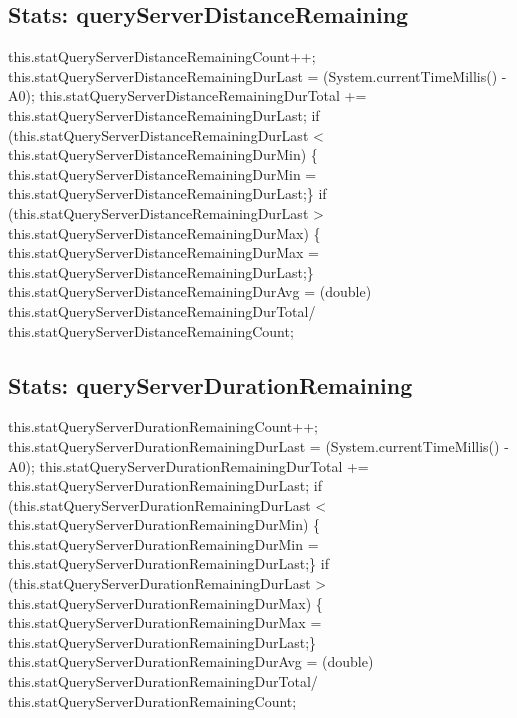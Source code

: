 \subsection{Stats: queryServerDistanceRemaining}
\nwenddocs{}\endmoddef{}
    this.statQueryServerDistanceRemainingCount++;
    this.statQueryServerDistanceRemainingDurLast = (System.currentTimeMillis() - A0);
    this.statQueryServerDistanceRemainingDurTotal +=
    this.statQueryServerDistanceRemainingDurLast;
if (this.statQueryServerDistanceRemainingDurLast <
    this.statQueryServerDistanceRemainingDurMin) \{
    this.statQueryServerDistanceRemainingDurMin =
    this.statQueryServerDistanceRemainingDurLast;\}
if (this.statQueryServerDistanceRemainingDurLast >
    this.statQueryServerDistanceRemainingDurMax) \{
    this.statQueryServerDistanceRemainingDurMax =
    this.statQueryServerDistanceRemainingDurLast;\}
    this.statQueryServerDistanceRemainingDurAvg = (double)
    this.statQueryServerDistanceRemainingDurTotal/
    this.statQueryServerDistanceRemainingCount;
\nwendcode{}\nwdocspar

\subsection{Stats: queryServerDurationRemaining}
\nwenddocs{}\endmoddef{}
    this.statQueryServerDurationRemainingCount++;
    this.statQueryServerDurationRemainingDurLast = (System.currentTimeMillis() - A0);
    this.statQueryServerDurationRemainingDurTotal +=
    this.statQueryServerDurationRemainingDurLast;
if (this.statQueryServerDurationRemainingDurLast <
    this.statQueryServerDurationRemainingDurMin) \{
    this.statQueryServerDurationRemainingDurMin =
    this.statQueryServerDurationRemainingDurLast;\}
if (this.statQueryServerDurationRemainingDurLast >
    this.statQueryServerDurationRemainingDurMax) \{
    this.statQueryServerDurationRemainingDurMax =
    this.statQueryServerDurationRemainingDurLast;\}
    this.statQueryServerDurationRemainingDurAvg = (double)
    this.statQueryServerDurationRemainingDurTotal/
    this.statQueryServerDurationRemainingCount;
\nwendcode{}\nwdocspar

